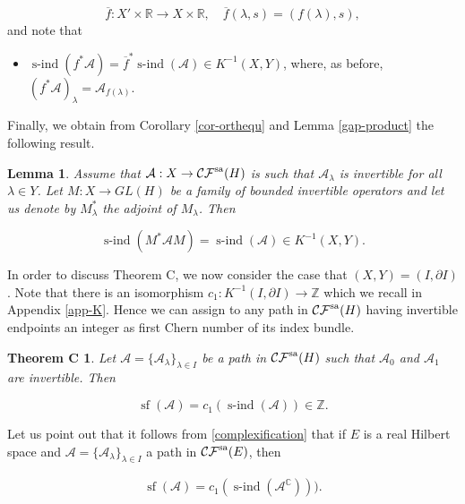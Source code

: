 \documentclass[a4paper,10pt]{article}
\newtheorem{lemma}[theorem]{Lemma}
\newtheorem*{theoremC}{Theorem C}
\DeclareMathOperator{\sind}{s-ind}
\DeclareMathOperator{\sfl}{sf}
\begin{document}
\[\overline{f}:X'\times\mathbb{R}\rightarrow X\times\mathbb{R},\quad \overline{f}(\lambda,s)=(f(\lambda),s),\]
and note that

\begin{itemize}
\item $\sind(f^\ast\mathcal{A})=\overline{f}^\ast\sind(\mathcal{A})\in K^{-1}(X,Y)$, where, as before, $(f^\ast\mathcal{A})_\lambda=\mathcal{A}_{f(\lambda)}$.
\end{itemize}
\noindent
Finally, we obtain from Corollary \ref{cor-orthequ} and Lemma \ref{gap-product} the following result.

\begin{lemma}\label{MANself}
Assume that $\mathcal{A}:X\rightarrow\mathcal{CF}^\textup{sa}(H)$ is such that $\mathcal{A}_\lambda$ is invertible for all $\lambda\in Y$. Let $M:X\rightarrow GL(H)$ be a family of bounded invertible operators and let us denote by $M^\ast_\lambda$ the adjoint of $M_\lambda$. Then

\[\sind(M^\ast \mathcal{A}M)=\sind(\mathcal{A})\in K^{-1}(X,Y).\]
\end{lemma}
\noindent
In order to discuss Theorem C, we now consider the case that $(X,Y)=(I,\partial I)$. Note that there is an isomorphism $c_1:K^{-1}(I,\partial I)\rightarrow\mathbb{Z}$ which we recall in Appendix \ref{app-K}. Hence we can assign to any path in $\mathcal{CF}^\textup{sa}(H)$ having invertible endpoints an integer as first Chern number of its index bundle.

\begin{theoremC}
Let $\mathcal{A}=\{\mathcal{A}_\lambda\}_{\lambda\in I}$ be a path in $\mathcal{CF}^\textup{sa}(H)$ such that $\mathcal{A}_0$ and $\mathcal{A}_1$ are invertible. Then

\[\sfl(\mathcal{A})=c_1(\sind(\mathcal{A}))\in\mathbb{Z}.\]
\end{theoremC}
\noindent
Let us point out that it follows from \eqref{complexification} that if $E$ is a real Hilbert space and $\mathcal{A}=\{\mathcal{A}_\lambda\}_{\lambda\in I}$ a path in $\mathcal{CF}^\textup{sa}(E)$, then

\begin{align}\label{Creal}
\sfl(\mathcal{A})=c_1(\sind(\mathcal{A}^\mathbb{C}))).
\end{align}







\end{document}
